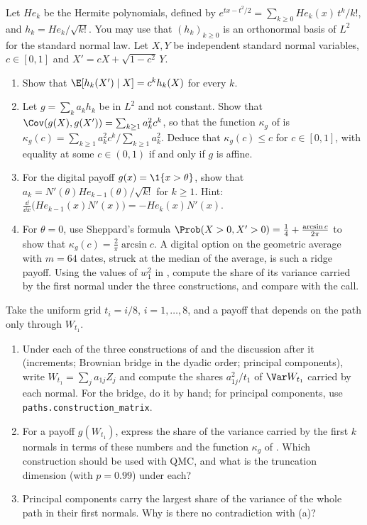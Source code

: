 \begin{exercise}\label{ex:qmc-ridge}
\hard Let $He_k$ be the Hermite polynomials, defined by
$e^{tx-t^2/2}=\sum_{k\ge0}He_k(x)\,t^k/k!$, and $h_k=He_k/\sqrt{k!}$. You may use that
$(h_k)_{k\ge0}$ is an orthonormal basis of $L^2$ for the standard normal law. Let $X,Y$ be
independent standard normal variables, $c\in[0,1]$ and $X'=cX+\sqrt{1-c^2}\,Y$.
\begin{enumerate}[label=(\alph*)]
  \item Show that $\E[h_k(X')\mid X]=c^kh_k(X)$ for every $k$.
  \item Let $g=\sum_ka_kh_k$ be in $L^2$ and not constant. Show that
    $\Cov(g(X),g(X'))=\sum_{k\ge1}a_k^2c^k$, so that the function $\kappa_g$ of
     is $\kappa_g(c)=\sum_{k\ge1}a_k^2c^k/\sum_{k\ge1}a_k^2$. Deduce that
    $\kappa_g(c)\le c$ for $c\in[0,1]$, with equality at some $c\in(0,1)$ if and only if $g$ is
    affine.
  \item For the digital payoff $g(x)=\1\{x>\theta\}$, show that
    $a_k=N'(\theta)He_{k-1}(\theta)/\sqrt{k!}$ for $k\ge1$. Hint:
    $\frac{\dd}{\dd x}\big(He_{k-1}(x)N'(x)\big)=-He_k(x)N'(x)$.
  \item For $\theta=0$, use Sheppard's formula
    $\Prob(X>0,X'>0)=\frac14+\frac{\arcsin c}{2\pi}$ to show that $\kappa_g(c)=\frac2\pi\arcsin c$.
    A digital option on the geometric average with $m=64$ dates, struck at the median of the
    average, is such a ridge payoff. Using the values of $w_1^2$ in ,
    compute the share of its variance carried by the first normal under the three
    constructions, and compare with the call.
\end{enumerate}
\end{exercise}

\begin{exercise}\label{ex:qmc-first-date}
\easy Take the uniform grid $t_i=i/8$, $i=1,\dots,8$, and a payoff that depends on the path
only through $W_{t_1}$.
\begin{enumerate}[label=(\alph*)]
  \item Under each of the three constructions of  and the discussion
    after it (increments; Brownian bridge in the dyadic order; principal components), write
    $W_{t_1}=\sum_ja_{1j}Z_j$ and compute the shares $a_{1j}^2/t_1$ of $\Var W_{t_1}$ carried by
    each normal. For the bridge, do it by hand; for principal components, use
    \texttt{paths.construction\_matrix}.
  \item For a payoff $g(W_{t_1})$, express the share of the variance carried by the first $k$
    normals in terms of these numbers and the function $\kappa_g$ of .
    Which construction should be used with QMC, and what is the truncation dimension (with
    $p=0.99$) under each?
  \item Principal components carry the largest share of the variance of the whole path in their
    first normals. Why is there no contradiction with (a)?
\end{enumerate}
\end{exercise}
